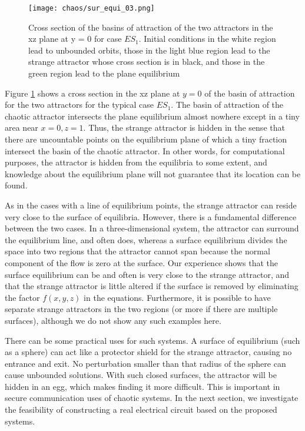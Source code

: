 \begin{figure}[htbp]
\centering
\texttt{[image: chaos/sur\_equi\_03.png]}
\caption{\label{fig:sur_fig3}
  Cross section of the basins of attraction of the
  two attractors in the xz plane at y = 0 for case $ES_1$. Initial
  conditions in the white region lead to unbounded
  orbits, those in the light blue
  region lead to the strange
  attractor whose cross
  section is in black, and those
  in the green region lead to
  the plane equilibrium
  }
\end{figure}

Figure \ref{fig:sur_fig3} shows a cross section in the xz plane at
$y = 0$ of the basin of attraction for the two attractors
for the typical case $ES_1$. The basin of attraction of the
chaotic attractor intersects the plane equilibrium almost
nowhere except in a tiny area near $x = 0, z = 1$. Thus,
the strange attractor is hidden in the sense that there are
uncountable points on the equilibrium plane of which a
tiny fraction intersect the basin of the chaotic attractor.
In other words, for computational purposes, the attractor
is hidden from the equilibria to some extent, and
knowledge about the equilibrium plane will not guarantee
that its location can be found.

As in the cases with a line of equilibrium points,
the strange attractor can reside very close to the surface
of equilibria. However, there is a fundamental difference
between the two cases. In a three-dimensional
system, the attractor can surround the equilibrium line,
and often does, whereas a surface equilibrium divides
the space into two regions that the attractor cannot span
because the normal component of the flow is zero at the
surface. Our experience shows that the surface equilibrium
can be and often is very close to the strange attractor,
and that the strange attractor is little altered if the
surface is removed by eliminating the factor $f(x,y,z)$
in the equations. Furthermore, it is possible to have separate
strange attractors in the two regions (or more if
there are multiple surfaces), although we do not show
any such examples here.

There can be some practical uses for such systems.
A surface of equilibrium (such as a sphere) can act like
a protector shield for the strange attractor, causing no
entrance and exit. No perturbation smaller than that
radius of the sphere can cause unbounded solutions.
With such closed surfaces, the attractor will be hidden
in an egg, which makes finding it more difficult. This
is important in secure communication uses of chaotic
systems. In the next section, we investigate the feasibility
of constructing a real electrical circuit based on
the proposed systems.


